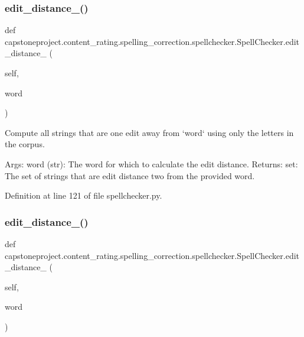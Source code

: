 \subsubsection{\texorpdfstring{edit\+\_\+distance\+\_()}{edit\_distance\_1()}}
{\footnotesize\ttfamily def capstoneproject.\+content\+\_\+rating.\+spelling\+\_\+correction.\+spellchecker.\+Spell\+Checker.\+edit\+\_\+distance\+\_ (\begin{DoxyParamCaption}\item[{}]{self,  }\item[{}]{word }\end{DoxyParamCaption})}

\begin{DoxyVerb}Compute all strings that are one edit away from `word` using only the letters in the corpus.

    Args:
word (str): The word for which to calculate the edit distance.
    Returns:
set: The set of strings that are edit distance two from the provided word.
\end{DoxyVerb}
 

Definition at line 121 of file spellchecker.\+py.

\mbox{\label{classcapstoneproject_1_1content__rating_1_1spelling__correction_1_1spellchecker_1_1_spell_checker_ab7f996fc76aae3a1d9de0fcf07e2864b}} 
\subsubsection{\texorpdfstring{edit\+\_\+distance\+\_()}{edit\_distance\_2()}}
{\footnotesize\ttfamily def capstoneproject.\+content\+\_\+rating.\+spelling\+\_\+correction.\+spellchecker.\+Spell\+Checker.\+edit\+\_\+distance\+\_ (\begin{DoxyParamCaption}\item[{}]{self,  }\item[{}]{word }\end{DoxyParamCaption})}

